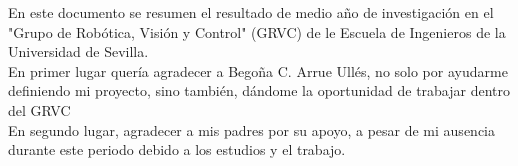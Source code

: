 En este documento se resumen el resultado de medio año de investigaci\'on en el "Grupo de Rob\'otica, Visi\'on y Control" (GRVC) de le Escuela de Ingenieros de la Universidad de Sevilla. \\


En primer lugar quer\'ia agradecer a Bego\~na C. Arrue Ull\'es, no solo por ayudarme definiendo mi proyecto, sino tambi\'en, d\'andome la oportunidad de trabajar dentro del GRVC \\

En segundo lugar, agradecer a mis padres por su apoyo, a pesar de mi ausencia durante este periodo debido a los estudios y el trabajo. \\
